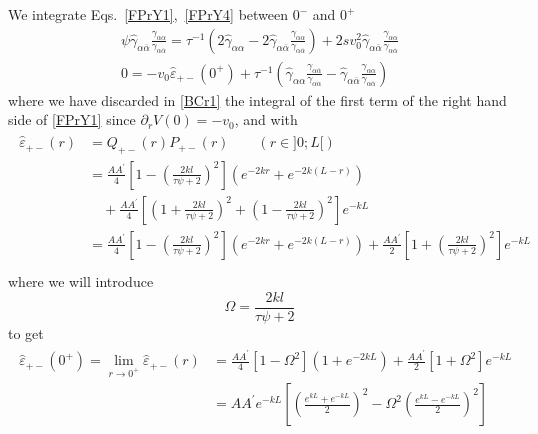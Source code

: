 \documentclass[pre,aps,superscriptaddress,nofootinbib]{revtex4}
\begin{document}
We integrate Eqs.~\ref{FPrY1},~\ref{FPrY4} between $0^-$ and $0^+$
\begin{eqnarray}
\label{BCr1}
\psi \hat{\gamma}_{\alpha\overline{\alpha}} \frac{\gamma_{\alpha\alpha}}{\gamma_{\alpha\overline{\alpha}}} = \tau^{-1} \left(2 \hat{\gamma}_{\alpha\alpha} - 2 \hat{\gamma}_{\alpha\overline{\alpha}} \frac{\gamma_{\alpha\alpha}}{\gamma_{\alpha\overline{\alpha}}}\right) + 2 s v_0^2 \hat{\gamma}_{\alpha\overline{\alpha}} \frac{\gamma_{\alpha\alpha}}{\gamma_{\alpha\overline{\alpha}}}\\
\label{BCr2}
0 = - v_0 \hat{\varepsilon}_{+-}(0^+) + \tau^{-1} \left(\hat{\gamma}_{\alpha\alpha} \frac{\gamma_{\alpha\overline{\alpha}}}{\gamma_{\alpha\alpha}} - \hat{\gamma}_{\alpha\overline{\alpha}} \frac{\gamma_{\alpha\alpha}}{\gamma_{\alpha\overline{\alpha}}}\right)
\end{eqnarray}
where we have discarded in \eqref{BCr1} the integral of the first term of the right hand side of \eqref{FPrY1} since $\partial_r V(0) = -v_0$, and with
\begin{eqnarray}
\label{he+-}
\begin{aligned}
\hat{\varepsilon}_{+-}(r) &= Q_{+-}(r) P_{+-}(r) \qquad (r \in ]0; L[)\\
&= \frac{A A^{\prime}}{4} \left[1 - \left(\frac{2 k l}{\tau \psi + 2}\right)^2\right](e^{-2 k r} + e^{-2 k (L - r)})\\
&\quad+ \frac{A A^{\prime}}{4} \left[\left(1 + \frac{2 k l}{\tau \psi + 2}\right)^2 + \left(1 - \frac{2 k l}{\tau \psi + 2}\right)^2\right] e^{-k L}\\
&= \frac{A A^{\prime}}{4} \left[1 - \left(\frac{2 k l}{\tau \psi + 2}\right)^2\right](e^{-2 k r} + e^{-2 k (L - r)}) + \frac{A A^{\prime}}{2} \left[1 + \left(\frac{2 k l}{\tau \psi + 2}\right)^2\right] e^{-k L}
\end{aligned}\\
\end{eqnarray}
where we will introduce
\begin{equation}
\Omega = \frac{2 k l}{\tau \psi + 2}
\label{Omega}
\end{equation}
to get
\begin{eqnarray}
\label{he+-lim}
\begin{aligned}
\hat{\varepsilon}_{+-}(0^+) = \lim_{r \to 0^+} \hat{\varepsilon}_{+-}(r) &= \frac{A A^{\prime}}{4} \left[1 - \Omega^2\right](1 + e^{-2 k L}) + \frac{A A^{\prime}}{2} \left[1 + \Omega^2\right] e^{-k L}\\
&= A A^{\prime} e^{-k L} \left[\left(\frac{e^{kL} + e^{-k L}}{2}\right)^2 - \Omega^2 \left(\frac{e^{kL} - e^{-k L}}{2}\right)^2\right]
\end{aligned}
\end{eqnarray}
\end{document}

